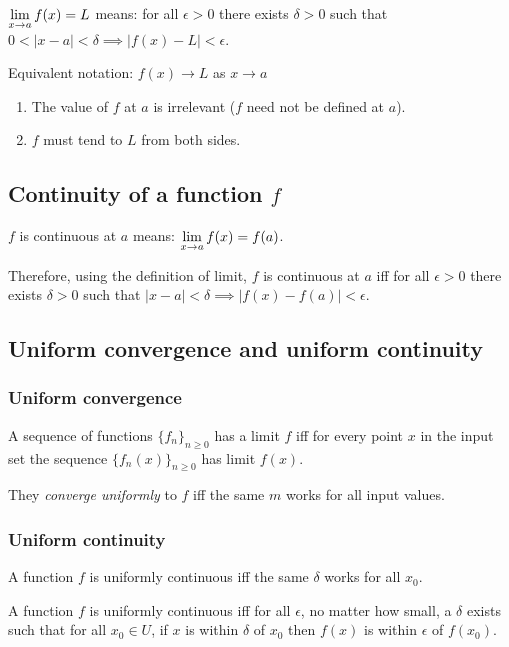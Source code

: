 $\LimEq{f(x)}{L}{x}{a}$ means: for all $\epsilon > 0$ there exists $\delta > 0$ such that
$0 < |x - a| < \delta \implies |f(x) - L| < \epsilon$.

Equivalent notation: $f(x) \to L$ as $x \to a$

\begin{remark*}\hspace{0pt}
  \begin{enumerate}
  \item The value of $f$ at $a$ is irrelevant ($f$ need not be defined at $a$).
  \item $f$ must tend to $L$ from both sides.
  \end{enumerate}
\end{remark*}

\subsection{Continuity of a function $f$}
$f$ is continuous at $a$ means: $\LimEq{f(x)}{f(a)}{x}{a}$.

Therefore, using the definition of limit, $f$ is continuous at $a$ iff for all $\epsilon > 0$
there exists $\delta > 0$ such that $|x - a| < \delta \implies |f(x) - f(a)| < \epsilon$.

\subsection{Uniform convergence and uniform continuity}

\subsubsection{Uniform convergence}
A sequence of functions $\{f_n\}_{n\geq 0}$ has a limit $f$ iff for every point
$x$ in the input set the sequence $\{f_n(x)\}_{n\geq 0}$ has limit $f(x)$.

They \textit{converge uniformly} to $f$ iff the same $m$ works for all input
values.

\subsubsection{Uniform continuity}
A function $f$ is uniformly continuous iff the same $\delta$ works for all $x_0$.

A function $f$ is uniformly continuous iff for all $\epsilon$, no matter how
small, a $\delta$ exists such that for all $x_0 \in U$, if $x$ is within
$\delta$ of $x_0$ then $f(x)$ is within $\epsilon$ of $f(x_0)$.

